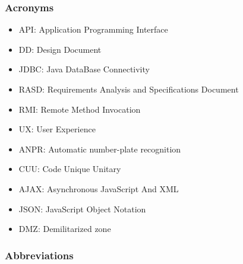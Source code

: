 \subsubsection{Acronyms}
\begin{itemize}
	\item
	API: Application Programming Interface
	\item
	DD: Design Document
	\item
	JDBC: Java DataBase Connectivity
	\item
	RASD: Requirements Analysis and Specifications Document
	\item
	RMI: Remote Method Invocation
	\item
	UX: User Experience
	\item
	ANPR: Automatic number-plate recognition
	\item
	CUU: Code Unique Unitary
	\item
	AJAX: Asynchronous JavaScript And XML
	\item 
	JSON: JavaScript Object Notation
	\item
	DMZ: Demilitarized zone
	
\end{itemize}

\subsubsection{Abbreviations}